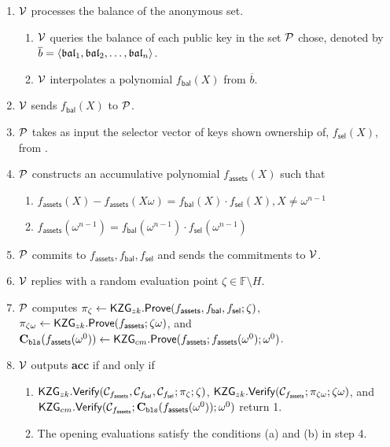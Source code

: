 

\begin{Protocol*}[t!]
\begin{mdframed}
\footnotesize


\begin{enumerate}
	\item $\mathcal{V}$ processes the balance of the anonymous set.
	\begin{enumerate}
		\item $\mathcal{V}$ queries the balance of each public key in the set $\mathcal{P}$ chose, denoted by $\overline{b}=\left \langle \mathfrak{bal}_1,\mathfrak{bal}_2,\dots,\mathfrak{bal}_n \right \rangle$.
		\item $\mathcal{V}$ interpolates a polynomial $f_\mathsf{bal}(X)$ from $\overline{b}$.
	\end{enumerate}
	\item $\mathcal{V}$ sends $f_\mathsf{bal}(X)$ to $\mathcal{P}$.
	\item $\mathcal{P}$ takes as input the selector vector of keys shown ownership of, $f_\mathsf{sel}(X)$, from \bootstrap.
	\item $\mathcal{P}$ constructs an accumulative polynomial $f_\mathsf{assets}(X)$ such that
		\begin{enumerate}
			\item $f_\mathsf{assets}(X)-f_\mathsf{assets}(X\omega)=f_\mathsf{bal}(X)\cdot{f_\mathsf{sel}(X)},X\ne{\omega^{n-1}}$
			\item $f_\mathsf{assets}(\omega^{n-1})=f_\mathsf{bal}(\omega^{n-1})\cdot{f_\mathsf{sel}}(\omega^{n-1})$
		\end{enumerate}
	\item $\mathcal{P}$ commits to $f_\mathsf{assets},f_\mathsf{bal},f_\mathsf{sel}$ and sends the commitments to $\mathcal{V}$.
	\item $\mathcal{V}$ replies with a random evaluation point $\zeta\in\mathbb{F}\setminus{H}$.
	\item $\mathcal{P}$ computes $\pi_\zeta\leftarrow\mathsf{KZG}_{zk}.\mathsf{Prove}(f_\mathsf{assets},f_\mathsf{bal},f_\mathsf{sel};\zeta)$, $\pi_{\zeta\omega}\leftarrow\mathsf{KZG}_{zk}.\mathsf{Prove}(f_\mathsf{assets};\zeta\omega)$, and $\textbf{C}_\texttt{bls}(f_\mathsf{assets}(\omega^0))\leftarrow\mathsf{KZG}_{cm}.\mathsf{Prove}(f_\mathsf{assets};f_\mathsf{assets}(\omega^0);\omega^0)$.
	\item $\mathcal{V}$ outputs \textbf{acc} if and only if
	\begin{enumerate}
		\item $\mathsf{KZG}_{zk}.\mathsf{Verify}(\mathcal{C}_{f_\mathsf{assets}},\mathcal{C}_{f_\mathsf{bal}},\mathcal{C}_{f_\mathsf{sel}};\pi_\zeta;\zeta)$, $\mathsf{KZG}_{zk}.\mathsf{Verify}(\mathcal{C}_{f_\mathsf{assets}};\pi_{\zeta\omega};\zeta\omega)$, and $\mathsf{KZG}_{cm}.\mathsf{Verify}(\mathcal{C}_{f_\mathsf{assets}};\textbf{C}_\texttt{bls}(f_\mathsf{assets}(\omega^0));\omega^0)$ return 1.
		\item The opening evaluations satisfy the conditions (a) and (b) in step 4.
	\end{enumerate}
\end{enumerate}	


\end{mdframed}
\end{Protocol*}
